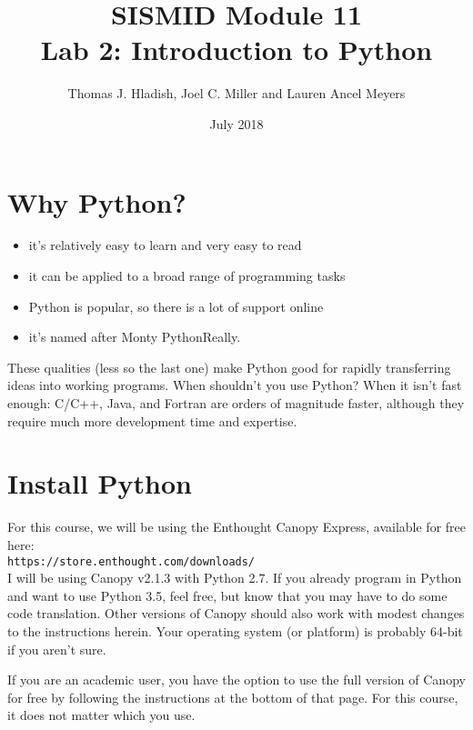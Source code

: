 \documentclass{article}
\begin{document}
\title{SISMID Module 11\\Lab 2: Introduction to Python}
\author{Thomas J. Hladish, Joel C. Miller and Lauren Ancel Meyers}
\date{July 2018}
\maketitle

\section*{Why Python?}
\begin{itemize}
\item it's relatively easy to learn and very easy to read
\item it can be applied to a broad range of programming tasks
\item Python is popular, so there is a lot of support online
\item it's named after Monty Python\textemdash Really.
\end{itemize}

These qualities (less so the last one) make Python good for rapidly transferring ideas into working programs.  When shouldn't you use Python?  When it
isn't fast enough: C/C++, Java, and Fortran are orders of magnitude faster, although they require much more development time and expertise.

\section*{Install Python}

For this course, we will be using the Enthought Canopy Express, available for free here:\\

\texttt{https://store.enthought.com/downloads/}\\

\noindent
I will be using Canopy v2.1.3 with Python 2.7.  If you already program in Python and want to use Python 3.5, feel free, but know that you may have to do some code translation.  Other versions of Canopy should also work with modest changes to the instructions herein.  Your operating system (or platform) is probably 64-bit if you aren't sure.

If you are an academic user, you have the option to use the full version of Canopy for free by following the instructions at the bottom of that page.  For this course, it does not matter which you use.
\end{document}

